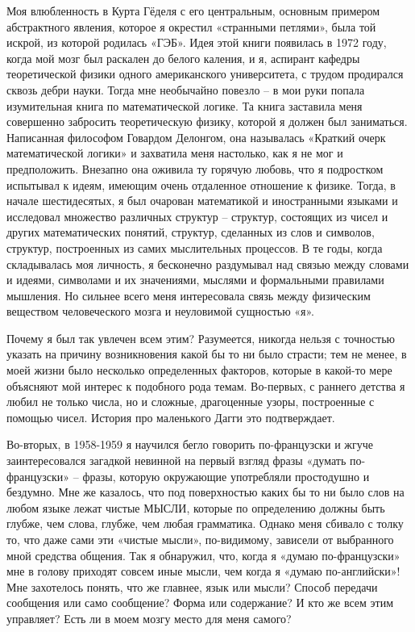 \documentclass[../main.tex]{subfiles}
\begin{document}
Моя влюбленность в Курта Гёделя с его центральным, основным примером абстрактного явления, которое я окрестил «странными петлями», была той искрой, из которой родилась «ГЭБ».
Идея этой книги появилась в 1972 году, когда мой мозг был раскален до белого каления, и я, аспирант кафедры теоретической физики одного американского университета, с трудом продирался сквозь дебри науки.
Тогда мне необычайно повезло \--- в мои руки попала изумительная книга по математической логике.
Та книга заставила меня совершенно забросить теоретическую физику, которой я должен был заниматься.
Написанная философом Говардом Делонгом, она называлась «Краткий очерк математической логики» и захватила меня настолько, как я не мог и предположить.
Внезапно она оживила ту горячую любовь, что я подростком испытывал к идеям, имеющим очень отдаленное отношение к физике.
Тогда, в начале шестидесятых, я был очарован математикой и иностранными языками и исследовал множество различных структур \--- структур, состоящих из чисел и других математических понятий, структур, сделанных из слов и символов, структур, построенных из самих мыслительных процессов.
В те годы, когда складывалась моя личность, я бесконечно раздумывал над связью между словами и идеями, символами и их значениями, мыслями и формальными правилами мышления.
Но сильнее всего меня интересовала связь между физическим веществом человеческого мозга и неуловимой сущностью «я».

Почему я был так увлечен всем этим?
Разумеется, никогда нельзя с точностью указать на причину возникновения какой бы то ни было страсти; тем не менее, в моей жизни было несколько определенных факторов, которые в какой-то мере объясняют мой интерес к подобного рода темам.
Во-первых, с раннего детства я любил не только числа, но и сложные, драгоценные узоры, построенные с помощью чисел.
История про маленького Дагги это подтверждает.

Во-вторых, в 1958-1959 я научился бегло говорить по-французски и жгуче заинтересовался загадкой невинной на первый взгляд фразы «думать по-французски» \--- фразы, которую окружающие употребляли простодушно и бездумно.
Мне же казалось, что под поверхностью каких бы то ни было слов на любом языке лежат чистые МЫСЛИ, которые по определению должны быть глубже, чем слова, глубже, чем любая грамматика.
Однако меня сбивало с толку то, что даже сами эти «чистые мысли», по-видимому, зависели от выбранного мной средства общения.
Так я обнаружил, что, когда я «думаю по-французски» мне в голову приходят совсем иные мысли, чем когда я «думаю по-английски»!
Мне захотелось понять, что же главнее, язык или мысли?
Способ передачи сообщения или само сообщение?
Форма или содержание?
И кто же всем этим управляет?
Есть ли в моем мозгу место для меня самого?
\end{document}
